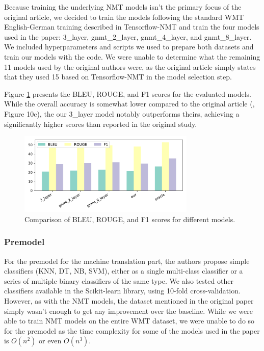 Because training the underlying NMT models isn't the primary focus of the original article, we decided to train the models following the standard WMT English-German training described in Tensorflow-NMT and train the four models used in the paper: 3\_layer, gnmt\_2\_layer, gnmt\_4\_layer, and gnmt\_8\_layer. We included hyperparameters and scripts we used to prepare both datasets and train our models with the code. We were unable to determine what the remaining 11 models used by the original authors were, as the original article simply states that they used 15  based on Tensorflow-NMT in the model selection step.

Figure \ref{fig:nlp_scores} presents the BLEU, ROUGE, and F1 scores for the evaluated models. While the overall accuracy is somewhat lower compared to the original article (\cite{marco2019optimizing}, Figure 10c), the our 3\_layer model notably outperforms theirs, achieving a significantly higher scores than reported in the original study.

\begin{figure}[ht]
  \centering
  \includegraphics[width=0.75\textwidth]{figures/ml_inf_score.pdf}
  \caption{Comparison of BLEU, ROUGE, and F1 scores for different models.}
  \label{fig:nlp_scores}
\end{figure}

\subsubsection{Premodel}
For the premodel for the machine translation part, the authors propose simple classifiers (KNN, DT, NB, SVM), either as a single multi-class classifier or a series of multiple binary classifiers of the same type. We also tested other classifiers available in the Scikit-learn library, using 10-fold cross-validation. However, as with the NMT models, the dataset mentioned in the original paper simply wasn't enough to get any improvement over the baseline. While we were able to train NMT models on the entire WMT dataset, we were unable to do so for the premodel as the time complexity for some of the models used in the paper is \(O(n^2)\) or even \(O(n^3)\).

